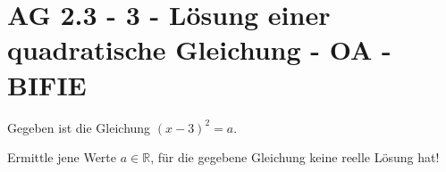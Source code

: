 \section{AG 2.3 - 3 - Lösung einer quadratische Gleichung - OA - BIFIE}

\begin{beispiel}[AG 2.3]{1} %
	Gegeben ist die Gleichung $(x-3)^2=a$.
	
	Ermittle jene Werte $a \in \mathbb{R}$, für die gegebene Gleichung keine reelle Lösung hat!
	
\end{beispiel}